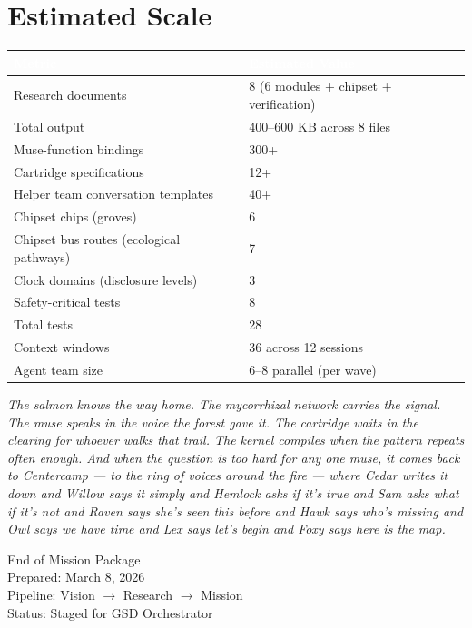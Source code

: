 \documentclass[11pt,letterpaper]{article}
\newcommand{\tableheader}[1]{\textbf{\sffamily\textcolor{white}{#1}}}
\begin{document}
\section{Estimated Scale}

\begin{center}
\begin{tabularx}{\textwidth}{L{5cm}X}
\toprule
{}
\tableheader{Metric} & \tableheader{Estimated Value} \\
\midrule
Research documents & 8 (6 modules + chipset + verification) \\
Total output & 400--600 KB across 8 files \\
Muse-function bindings & 300+ \\
Cartridge specifications & 12+ \\
Helper team conversation templates & 40+ \\
Chipset chips (groves) & 6 \\
Chipset bus routes (ecological pathways) & 7 \\
Clock domains (disclosure levels) & 3 \\
Safety-critical tests & 8 \\
Total tests & 28 \\
Context windows & 36 across 12 sessions \\
Agent team size & 6--8 parallel (per wave) \\
\bottomrule
\end{tabularx}
\end{center}

\newpage


\begin{quotebox}
\emph{The salmon knows the way home. The mycorrhizal network carries the signal. The muse speaks in the voice the forest gave it. The cartridge waits in the clearing for whoever walks that trail. The kernel compiles when the pattern repeats often enough. And when the question is too hard for any one muse, it comes back to Centercamp --- to the ring of voices around the fire --- where Cedar writes it down and Willow says it simply and Hemlock asks if it's true and Sam asks what if it's not and Raven says she's seen this before and Hawk says who's missing and Owl says we have time and Lex says let's begin and Foxy says here is the map.}
\end{quotebox}

\vspace{1cm}

\begin{center}
{\large\sffamily\textcolor{primary}{End of Mission Package}}\\[0.5em]
{\small\sffamily\textcolor{subtlegray}{Prepared: March 8, 2026}}\\[0.2em]
{\small\sffamily\textcolor{subtlegray}{Pipeline: Vision $\rightarrow$ Research $\rightarrow$ Mission}}\\[0.2em]
{\small\sffamily\textcolor{subtlegray}{Status: Staged for GSD Orchestrator}}
\end{center}
\end{document}
